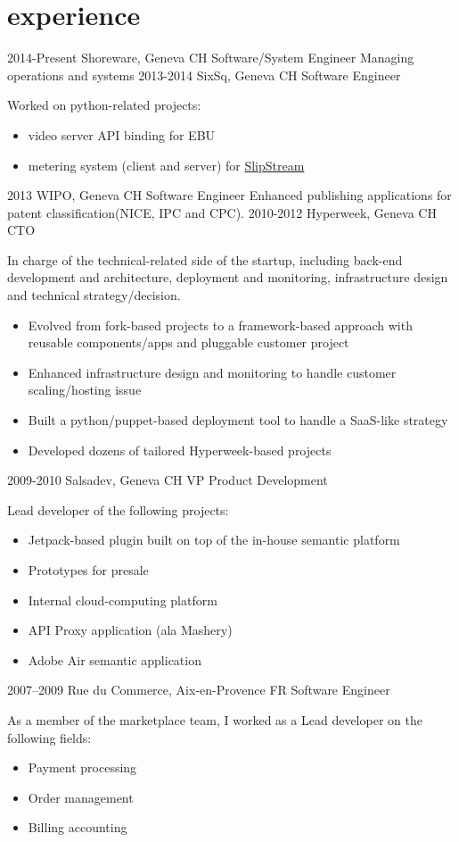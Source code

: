 \documentclass[]{friggeri}
\begin{document}
\section{experience}

\begin{entrylist}
  \entry
    {2014-Present}
    {Shoreware, Geneva CH}
    {Software/System Engineer}
    {Managing operations and systems}
  \entry
    {2013-2014}
    {SixSq, Geneva CH}
    {Software Engineer}
    {Worked on python-related projects:
    \begin{itemize}
    \item video server API binding for \ac{EBU}
    \item metering system (client and server) for
    \href{http://sixsq.com/products/slipstream.html}{SlipStream{\texttrademark}}
    \end{itemize}}
  \entry
    {2013}
    {\ac{WIPO}, Geneva CH}
    {Software Engineer}
    {Enhanced publishing applications for patent classification(NICE, IPC
    and CPC).}
  \entry
    {2010-2012}
    {Hyperweek, Geneva CH}
    {CTO}
    {In charge of the technical-related side of the startup, including
    back-end development and architecture, deployment and monitoring,
    infrastructure design and technical strategy/decision.
    \begin{itemize}
    \item Evolved from fork-based projects to a framework-based approach with
    reusable components/apps and pluggable customer project
    \item Enhanced infrastructure design and monitoring to handle customer
    scaling/hosting issue
    \item Built a python/puppet-based deployment tool to handle a SaaS-like
    strategy
    \item Developed dozens of tailored Hyperweek-based projects
    \end{itemize}}
  \entry
    {2009-2010}
    {Salsadev, Geneva CH}
    {VP Product Development}
    {Lead developer of the following projects:
    \begin{itemize}
    \item Jetpack-based plugin built on top of the in-house semantic platform
    \item Prototypes for presale
    \item Internal cloud-computing platform
    \item API Proxy application (ala Mashery)
    \item Adobe Air semantic application
    \end{itemize}}
  \entry
    {2007–2009}
    {Rue du Commerce, Aix-en-Provence FR}
    {Software Engineer}
    {As a member of the marketplace team, I worked as a Lead developer on the
    following fields:
    \begin{itemize}
    \item Payment processing
    \item Order management
    \item Billing accounting
    \end{itemize}}
\end{entrylist}
\end{document}
